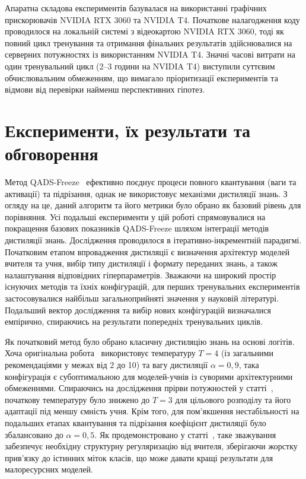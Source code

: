 \documentclass{pma-mthesis}
\begin{document}
Апаратна складова експериментів базувалася на використанні графічних прискорювачів NVIDIA RTX 3060 та NVIDIA T4. Початкове налагодження коду проводилося на локальній системі з відеокартою NVIDIA RTX 3060, тоді як повний цикл тренування та отримання фінальних результатів здійснювалися на серверних потужностях із використанням NVIDIA T4. Значні часові витрати на один тренувальний цикл (2--3 години на NVIDIA T4) виступили суттєвим обчислювальним обмеженням, що вимагало пріоритизації експериментів та відмови від перевірки найменш перспективних гіпотез.


\section{Експерименти, їх результати та обговорення}

Метод QADS-Freeze~\cite{10946020} ефективно поєднує процеси повного квантування (ваги та активації) та підрізання, однак не використовує механізми дистиляції знань. З огляду на це, даний алгоритм та його метрики було обрано як базовий рівень для порівняння. Усі подальші експерименти у цій роботі спрямовувалися на покращення базових показників QADS-Freeze шляхом інтеграції методів дистиляції знань. Дослідження проводилося в ітеративно-інкрементній парадигмі. Початковим етапом впровадження дистиляції є визначення архітектур моделей вчителя та учня, вибір типу дистиляції і формату переданих знань, а також налаштування відповідних гіперпараметрів. Зважаючи на широкий простір існуючих методів та їхніх конфігурацій, для перших тренувальних експериментів застосовувалися найбільш загальноприйняті значення у науковій літературі. Подальший вектор дослідження та вибір нових конфігурацій визначалися емпірично, спираючись на результати попередніх тренувальних циклів.

Як початковий метод було обрано класичну дистиляцію знань на основі логітів. Хоча оригінальна робота~\cite{hinton2014distilling} використовує температуру $T=4$ (із загальними рекомендаціями у межах від 2 до 10) та вагу дистиляції $\alpha=0,9$, така конфігурація є субоптимальною для моделей-учнів із суворими архітектурними обмеженнями. Спираючись на дослідження прірви потужностей у статті~\cite{cho2019efficacy}, початкову температуру було знижено до $T=3$ для  цільового розподілу та його адаптації під меншу ємність учня. Крім того, для пом'якшення нестабільності на подальших етапах квантування та підрізання коефіцієнт дистиляції було збалансовано до $\alpha=0,5$. Як продемонстровано у статті~\cite{mishra2018apprentice}, таке зважування забезпечує необхідну структурну регуляризацію від вчителя, зберігаючи жорстку прив'язку до істинних міток класів, що може давати кращі результати для малоресурсних моделей.
\end{document}
